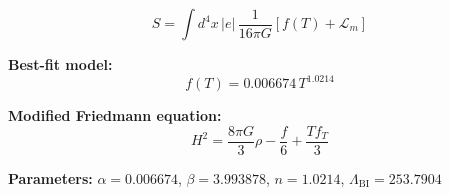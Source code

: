 
\begin{equation}
  S = \int d^4x \, |e| \, \frac{1}{16\pi G} \left[ f(T) + \mathcal{L}_m \right]
\end{equation}

\textbf{Best-fit model:}
\begin{equation}
  f(T) = 0.006674 \, T^{1.0214}
\end{equation}

\textbf{Modified Friedmann equation:}
\begin{equation}
  H^2 = \frac{8\pi G}{3} \rho - \frac{f}{6} + \frac{T f_T}{3}
\end{equation}

\textbf{Parameters:}
$\alpha = 0.006674$, \quad
$\beta = 3.993878$, \quad
$n = 1.0214$, \quad
$\Lambda_{\text{BI}} = 253.7904$